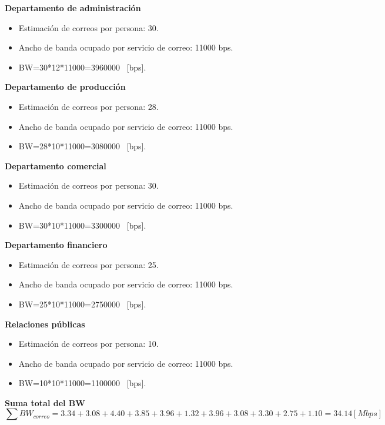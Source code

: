 \documentclass[12pt,letterpaper]{article}
\begin{document}
\textbf{Departamento de administración}
\begin{itemize}
    \item Estimación de correos por persona: 30. 
    \item Ancho de banda ocupado por servicio de correo: 11000 bps.
    \item BW=30*12*11000=3960000 \ [bps].
\end{itemize}
\textbf{Departamento de producción}
\begin{itemize}
    \item Estimación de correos por persona: 28. 
    \item Ancho de banda ocupado por servicio de correo: 11000 bps.
    \item BW=28*10*11000=3080000 \ [bps].
\end{itemize}
\textbf{Departamento comercial}
\begin{itemize}
    \item Estimación de correos por persona: 30. 
    \item Ancho de banda ocupado por servicio de correo: 11000 bps.
    \item BW=30*10*11000=3300000 \ [bps].
\end{itemize}
\textbf{Departamento financiero}
\begin{itemize}
    \item Estimación de correos por persona: 25. 
    \item Ancho de banda ocupado por servicio de correo: 11000 bps.
    \item BW=25*10*11000=2750000 \ [bps].
\end{itemize}
\textbf{Relaciones públicas}
\begin{itemize}
    \item Estimación de correos por persona: 10. 
    \item Ancho de banda ocupado por servicio de correo: 11000 bps.
    \item BW=10*10*11000=1100000 \ [bps].
\end{itemize}
\textbf{Suma total del BW}
\begin{equation}
    \sum BW_{correo}=3.34+3.08+4.40+3.85+3.96+1.32+3.96+3.08+3.30+2.75+1.10=34.14[Mbps]
\end{equation}

\newpage
\end{document}
